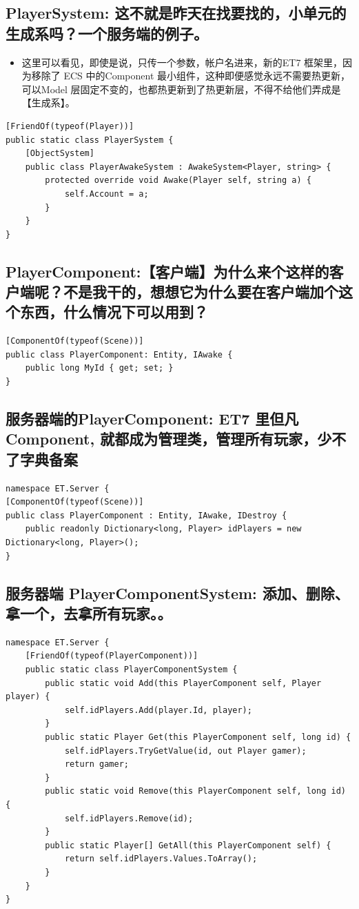 \documentclass[9pt, b5paper]{article}
\begin{document}
\subsection{PlayerSystem: 这不就是昨天在找要找的，小单元的生成系吗？一个服务端的例子。}
\label{sec-9-2}
\begin{itemize}
\item 这里可以看见，即使是说，只传一个参数，帐户名进来，新的ET7 框架里，因为移除了 ECS 中的Component 最小组件，这种即便感觉永远不需要热更新，可以Model 层固定不变的，也都热更新到了热更新层，不得不给他们弄成是【生成系】。
\end{itemize}
\begin{verbatim}
[FriendOf(typeof(Player))]
public static class PlayerSystem {
    [ObjectSystem]
    public class PlayerAwakeSystem : AwakeSystem<Player, string> {
        protected override void Awake(Player self, string a) {
            self.Account = a;
        }
    }
}
\end{verbatim}
\subsection{PlayerComponent:【客户端】为什么来个这样的客户端呢？不是我干的，想想它为什么要在客户端加个这个东西，什么情况下可以用到？}
\label{sec-9-3}
\begin{verbatim}
[ComponentOf(typeof(Scene))]
public class PlayerComponent: Entity, IAwake {
    public long MyId { get; set; }
}
\end{verbatim}
\subsection{服务器端的PlayerComponent: ET7 里但凡Component, 就都成为管理类，管理所有玩家，少不了字典备案}
\label{sec-9-4}
\begin{verbatim}
namespace ET.Server {
[ComponentOf(typeof(Scene))]
public class PlayerComponent : Entity, IAwake, IDestroy {
    public readonly Dictionary<long, Player> idPlayers = new Dictionary<long, Player>();
}
\end{verbatim}
\subsection{服务器端 PlayerComponentSystem: 添加、删除、拿一个，去拿所有玩家。。}
\label{sec-9-5}
\begin{verbatim}
namespace ET.Server {
    [FriendOf(typeof(PlayerComponent))]
    public static class PlayerComponentSystem {
        public static void Add(this PlayerComponent self, Player player) {
            self.idPlayers.Add(player.Id, player);
        }
        public static Player Get(this PlayerComponent self, long id) {
            self.idPlayers.TryGetValue(id, out Player gamer);
            return gamer;
        }
        public static void Remove(this PlayerComponent self, long id) {
            self.idPlayers.Remove(id);
        }
        public static Player[] GetAll(this PlayerComponent self) {
            return self.idPlayers.Values.ToArray();
        }
    }
}
\end{verbatim}
\end{document}
